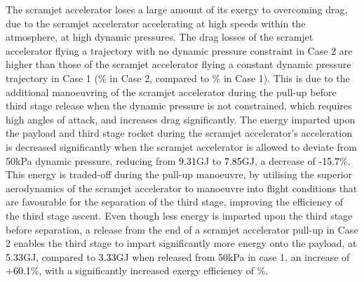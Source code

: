  The scramjet accelerator loses a large amount of its exergy to overcoming drag, due to the scramjet accelerator accelerating at high speeds within the atmosphere, at high dynamic pressures. 
 The drag losses of the scramjet accelerator flying a trajectory with no dynamic pressure constraint in Case 2 are higher than those of the scramjet accelerator flying a constant dynamic pressure trajectory in Case 1 (\WDsecondStandardNoReturn\% in Case 2, compared to \WDsecondConstqNoReturn\% in Case 1). This is due to the additional manoeuvring of the scramjet accelerator during the pull-up before third stage release when the dynamic pressure is not constrained, which requires high angles of attack, and increases drag significantly. 
The energy imparted upon the payload and third stage rocket during the scramjet accelerator's acceleration is decreased significantly when the scramjet accelerator is allowed to deviate from 50kPa dynamic pressure, reducing from \textcolor{black}{9.31}GJ to \textcolor{black}{7.85}GJ, a decrease of \textcolor{black}{-15.7}\%. This energy is traded-off during the pull-up manoeuvre, by utilising the superior aerodynamics of the scramjet accelerator to manoeuvre into flight conditions that are favourable for the separation of the third stage, improving the efficiency of the third stage ascent. Even though less energy is imparted upon the third stage before separation, a release from the end of a scramjet accelerator pull-up in Case 2 enables the third stage to impart significantly more energy onto the payload, at \textcolor{black}{5.33}GJ, compared to \textcolor{black}{3.33}GJ when released from 50kPa in case 1, an increase of \textcolor{black}{+60.1}\%, with a significantly increased exergy efficiency of \thirddExergyEffStandardNoReturn \%.  

